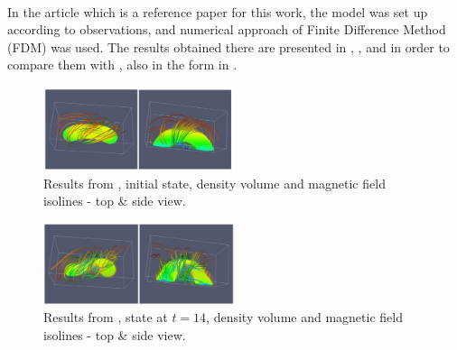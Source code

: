 \paragraph{}
In the article \cite{miraClanek} which is a reference paper for this work, the model was set up according to observations, and numerical approach of Finite Difference Method (FDM) was used. The results obtained there are presented in , , and in order to compare them with , also in the form in .

\begin{figure}[H]
	\begin{center}
		\includegraphics[width=0.5\textwidth]{img/td-setup/fromHalpha-initialFD.jpg}
	\caption{Results from \cite{miraClanek}, initial state, density volume and magnetic field isolines - top \& side view.}
	\label{figure:miraResult0}
	\end{center}
\end{figure}

\begin{figure}[H]
	\begin{center}
		\includegraphics[width=0.5\textwidth]{img/td-setup/fromHalpha-14FD.jpg}
	\caption{Results from \cite{miraClanek}, state at $t = 14$, density volume and magnetic field isolines - top \& side view.}
	\label{figure:miraResult14}
	\end{center}
\end{figure}

